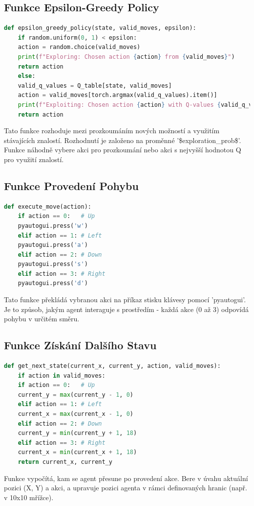 \documentclass[12pt, a4paper,
twoside,        %
openright
]{report}
\begin{document}
\subsection{Funkce Epsilon-Greedy Policy}
\begin{lstlisting}[language=Python]
	def epsilon_greedy_policy(state, valid_moves, epsilon):
	if random.uniform(0, 1) < epsilon:
	action = random.choice(valid_moves)
	print(f"Exploring: Chosen action {action} from {valid_moves}")
	return action
	else:
	valid_q_values = Q_table[state, valid_moves]
	action = valid_moves[torch.argmax(valid_q_values).item()]
	print(f"Exploiting: Chosen action {action} with Q-values {valid_q_values}")
	return action
\end{lstlisting}
Tato funkce rozhoduje mezi prozkoumáním nových možností a využitím stávajících znalostí. Rozhodnutí je založeno na proměnné '\$exploration\_prob\$'. Funkce náhodně vybere akci pro prozkoumání nebo akci s nejvyšší hodnotou Q pro využití znalostí.

\newpage
\subsection{Funkce Provedení Pohybu}
\begin{lstlisting}[language=Python]
	def execute_move(action):
	if action == 0:   # Up
	pyautogui.press('w')
	elif action == 1: # Left
	pyautogui.press('a')
	elif action == 2: # Down
	pyautogui.press('s')
	elif action == 3: # Right
	pyautogui.press('d')
\end{lstlisting}
Tato funkce překládá vybranou akci na příkaz stisku klávesy pomocí 'pyautogui'. Je to způsob, jakým agent interaguje s prostředím - každá akce (0 až 3) odpovídá pohybu v určitém směru.

\subsection{Funkce Získání Dalšího Stavu}
\begin{lstlisting}[language=Python]
	def get_next_state(current_x, current_y, action, valid_moves):
	if action in valid_moves:
	if action == 0:   # Up
	current_y = max(current_y - 1, 0)
	elif action == 1: # Left
	current_x = max(current_x - 1, 0)
	elif action == 2: # Down
	current_y = min(current_y + 1, 18)
	elif action == 3: # Right
	current_x = min(current_x + 1, 18)
	return current_x, current_y
\end{lstlisting}
Funkce vypočítá, kam se agent přesune po provedení akce. Bere v úvahu aktuální pozici (X, Y) a akci, a upravuje pozici agenta v rámci definovaných hranic (např. v 10x10 mřížce).
\end{document}
